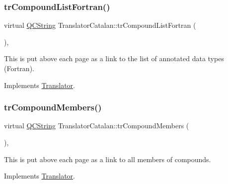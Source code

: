 \mbox{\label{class_translator_catalan_ac0b8832e98df992ce51e898159f30424}} 
\subsubsection{\texorpdfstring{trCompoundListFortran()}{trCompoundListFortran()}}
{\footnotesize\ttfamily virtual \mbox{\hyperlink{class_q_c_string}{Q\+C\+String}} Translator\+Catalan\+::tr\+Compound\+List\+Fortran (\begin{DoxyParamCaption}{ }\end{DoxyParamCaption})\hspace{0.3cm}{\ttfamily [inline]}, {\ttfamily [virtual]}}

This is put above each page as a link to the list of annotated data types (Fortran). 

Implements \mbox{\hyperlink{class_translator}{Translator}}.

\mbox{\label{class_translator_catalan_a9583b0d31ac7586fd57eb4f1ad3a79b6}} 
\subsubsection{\texorpdfstring{trCompoundMembers()}{trCompoundMembers()}}
{\footnotesize\ttfamily virtual \mbox{\hyperlink{class_q_c_string}{Q\+C\+String}} Translator\+Catalan\+::tr\+Compound\+Members (\begin{DoxyParamCaption}{ }\end{DoxyParamCaption})\hspace{0.3cm}{\ttfamily [inline]}, {\ttfamily [virtual]}}

This is put above each page as a link to all members of compounds. 

Implements \mbox{\hyperlink{class_translator}{Translator}}.

\mbox{\label{class_translator_catalan_aae59500686bd3caf9097e08b75d00220}} 
